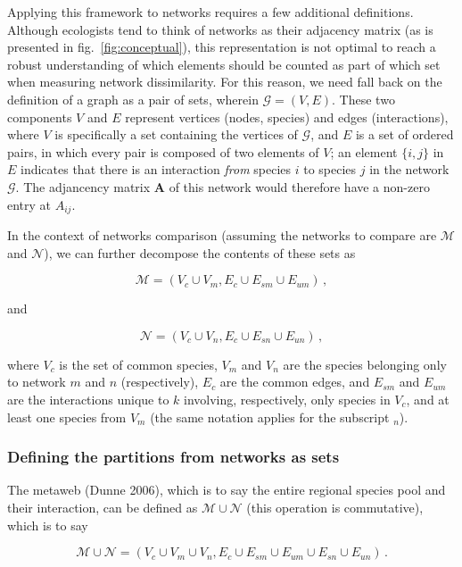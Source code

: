\documentclass[10pt,oneside]{article}
\begin{document}
Applying this framework to networks requires a few additional
definitions. Although ecologists tend to think of networks as their
adjacency matrix (as is presented in fig.~\ref{fig:conceptual}), this
representation is not optimal to reach a robust understanding of which
elements should be counted as part of which set when measuring network
dissimilarity. For this reason, we need fall back on the definition of a
graph as a pair of sets, wherein \(\mathcal{G} = (V, E)\). These two
components \(V\) and \(E\) represent vertices (nodes, species) and edges
(interactions), where \(V\) is specifically a set containing the
vertices of \(\mathcal{G}\), and \(E\) is a set of ordered pairs, in
which every pair is composed of two elements of \(V\); an element
\(\{i,j\}\) in \(E\) indicates that there is an interaction \emph{from}
species \(i\) to species \(j\) in the network \(\mathcal{G}\). The
adjancency matrix \(\mathbf{A}\) of this network would therefore have a
non-zero entry at \(A_{ij}\).

In the context of networks comparison (assuming the networks to compare
are \(\mathcal{M}\) and \(\mathcal{N}\)), we can further decompose the
contents of these sets as

\[\mathcal{M} = (V_c \cup V_m, E_c \cup E_{sm} \cup E_{um}) \,,\]

and

\[\mathcal{N} = (V_c \cup V_n, E_c \cup E_{sn} \cup E_{un}) \,,\]

where \(V_c\) is the set of common species, \(V_m\) and \(V_n\) are the
species belonging only to network \(m\) and \(n\) (respectively),
\(E_c\) are the common edges, and \(E_{sm}\) and \(E_{um}\) are the
interactions unique to \(k\) involving, respectively, only species in
\(V_c\), and at least one species from \(V_m\) (the same notation
applies for the subscript \(_{n}\)).

\hypertarget{defining-the-partitions-from-networks-as-sets}{%
\subsubsection{Defining the partitions from networks as
sets}\label{defining-the-partitions-from-networks-as-sets}}

The metaweb (Dunne 2006), which is to say the entire regional species
pool and their interaction, can be defined as
\(\mathcal{M} \cup \mathcal{N}\) (this operation is commutative), which
is to say

\[\mathcal{M} \cup \mathcal{N} = (V_c \cup V_m \cup V_n, E_c \cup E_{sm} \cup E_{um} \cup E_{sn} \cup E_{un}) \,.\]
\end{document}
